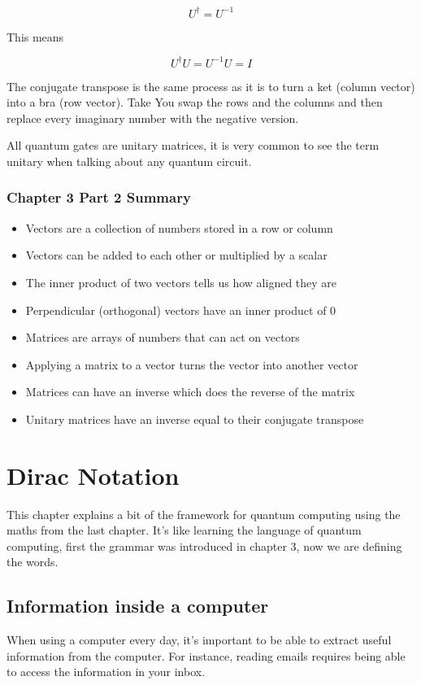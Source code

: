 \documentclass{book}
\begin{document}
$$ U^\dagger = U^{-1} $$

This means 

$$ U^\dagger U = U^{-1}U = I $$

The conjugate transpose is the same process as it is to turn a ket (column vector) into a bra (row vector). Take You swap the rows and the columns and then replace every imaginary number with the negative version. 

All quantum gates are unitary matrices, it is very common to see the term unitary when talking about any quantum circuit. 


\subsection{Chapter 3 Part 2 Summary }
\begin{itemize} 
    \item Vectors are a collection of numbers stored in a row or column
    \item Vectors can be added to each other or multiplied by a scalar
    \item The inner product of two vectors tells us how aligned they are
    \item  Perpendicular (orthogonal) vectors have an inner product of 0
    \item  Matrices are arrays of numbers that can act on vectors 
    \item  Applying a matrix to a vector turns the vector into another vector
    \item  Matrices can have an inverse which does the reverse of the matrix 
    \item  Unitary matrices have an inverse equal to their conjugate transpose
\end{itemize}

\chapter{Dirac Notation}
This chapter explains a bit of the framework for quantum computing using the maths from the last chapter. It's like learning the language of quantum computing, first the grammar was introduced in chapter 3, now we are defining the words.  

\section{ Information inside a computer }

When using a computer every day, it's important to be able to extract useful information from the computer. For instance, reading emails requires being able to access the information in your inbox. 
\end{document}
